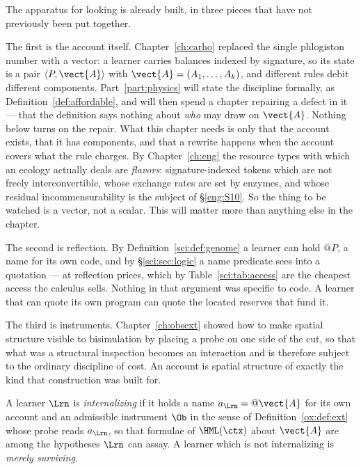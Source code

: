 The apparatus for looking is already built, in three pieces that have not
previously been put together.

The first is the account itself.
Chapter~\ref{ch:carho} replaced the single phlogiston number with a
vector: a learner carries balances indexed by signature, so its state is
a pair $\langle P, \vect{A}\rangle$ with $\vect{A} = (A_1,\ldots,A_k)$,
and different rules debit different components.
Part~\ref{part:physics} will state the discipline formally, as
Definition~\ref{def:affordable}, and will then spend a chapter repairing
a defect in it --- that the definition says nothing about \emph{who} may
draw on $\vect{A}$.
Nothing below turns on the repair.
What this chapter needs is only that the account exists, that it has
components, and that a rewrite happens when the account covers what the
rule charges.
By Chapter~\ref{ch:eng} the
resource types with which an ecology actually deals are \emph{flavors}:
signature-indexed tokens which are not freely interconvertible, whose
exchange rates are set by enzymes, and whose residual incommensurability
is the subject of \S\ref{eng:S10}.
So the thing to be watched is a vector, not a scalar.
This will matter more than anything else in the chapter.

The second is reflection.
By Definition~\ref{sci:def:genome} a learner can hold $@P$, a name for
its own code, and by \S\ref{sci:sec:logic} a name predicate sees into a
quotation --- at reflection prices, which by Table~\ref{sci:tab:access}
are the cheapest access the calculus sells.
Nothing in that argument was specific to code.
A learner that can quote its own program can quote the located reserves
that fund it.

The third is instruments.
Chapter~\ref{ch:obsext} showed how to make spatial structure visible to
bisimulation by placing a probe on one side of the cut, so that what was
a structural inspection becomes an interaction and is therefore subject
to the ordinary discipline of cost.
An account is spatial structure of exactly the kind that construction was
built for.

\begin{definition}
\label{suf:def:internal}
A learner $\Lrn$ is \emph{internalizing} if it holds a name
$a_\Lrn = @\vect{A}$ for its own account and an admissible instrument
$\Ob$ in the sense of Definition~\ref{ox:def:ext} whose probe reads
$a_\Lrn$, so that formulae of $\HML(\ctx)$ about $\vect{A}$ are among the
hypotheses $\Lrn$ can assay.
A learner which is not internalizing is \emph{merely surviving}.
\end{definition}

